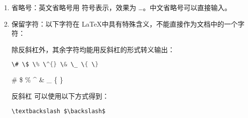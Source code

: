\begin{enumerate}
\item 省略号：英文省略号用 \boxforcmd{\\ldots} 符号表示，效果为 \ldots 。中文省略号可以直接输入。

\item 保留字符：以下字符在 \LaTeX 中具有特殊含义，不能直接作为文档中的一个字符：

\begin{tcolorbox}

\end{tcolorbox}

除反斜杠外，其余字符均能用反斜杠的形式转义输出：

\begin{tcolorbox}[sidebyside]
\begin{lstlisting}[language=C]
\# \$ \% \^{} \& \_ \{ \}
\end{lstlisting} 

\tcblower

\; \# \$ \% \^{} \& \_ \{ \}
\end{tcolorbox}

反斜杠 \boxforcmd{\\} 可以使用以下方式得到：

\begin{tcolorbox}
\begin{lstlisting}
\textbackslash $\backslash$
\end{lstlisting}
\end{tcolorbox}


\end{enumerate}